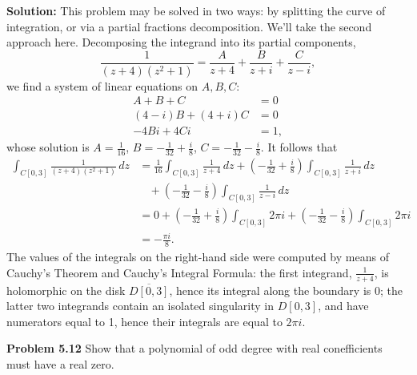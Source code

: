 \documentclass[12pt,oneside]{exam}
\newenvironment{exercise}[1]{\vspace{.1in}\noindent\textbf{Problem #1 \hspace{.05em}}}{}
\begin{document}
\vspace{0.5cm}
\noindent \textbf{Solution:} This problem may be solved in two ways: by splitting the curve of integration, or via a partial fractions decomposition. We'll take the second approach here. Decomposing the integrand into its partial components, 
\begin{equation*}
\frac{1}{(z+4)(z^2+1)} = \frac{A}{z+4} + \frac{B}{z+i} + \frac{C}{z-i},
\end{equation*}
we find a system of linear equations on $A,B,C$:
\begin{align*}
 A + B + C & = 0 \\
 (4-i)B + (4+i)C & = 0 \\
 -4Bi +4Ci & = 1,
\end{align*}
whose solution is $A=\frac{1}{16}$, $B=-\frac{1}{32} +\frac{i}{8}$, $C = -\frac{1}{32}-\frac{i}{8}$. It follows that 
\begin{align*}
\int_{C[0,3]} \frac{1}{(z+4)(z^2+1)} \, dz & = \frac{1}{16}\int_{C[0,3]} \frac{1}{z+4}\, dz + \left(-\frac{1}{32} +\frac{i}{8}\right)\int_{C[0,3]} \frac{1}{z+i}\, dz \\
& \ \ \ \  + \left( -\frac{1}{32}-\frac{i}{8}\right) \int_{C[0,3]} \frac{1}{z-i}\, dz \\
& = 0 + \left(-\frac{1}{32} +\frac{i}{8}\right)\int_{C[0,3]} 2\pi i + \left( -\frac{1}{32}-\frac{i}{8}\right) \int_{C[0,3]} 2\pi i \\
& = -\frac{\pi i}{8}.
\end{align*}
The values of the integrals on the right-hand side were computed by means of Cauchy's Theorem and Cauchy's Integral Formula: the first integrand, $\frac{1}{z+4}$, is holomorphic on the disk $\overline{D[0,3]}$, hence its integral along the boundary is $0$; the latter two integrands contain an isolated singularity in $D[0,3]$, and have numerators equal to 1, hence their integrals are equal to $2\pi i$. 
\vspace{1cm}

\begin{exercise}{5.12}
Show that a polynomial of odd degree with real conefficients must have a real zero.
\end{exercise}
\end{document}
